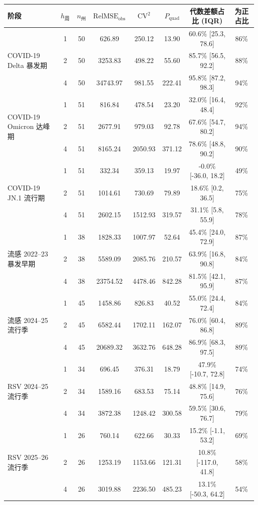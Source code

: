 \begin{tabular}{lccccccc}
\toprule
阶段 & $h_{\text{周}}$ & $n_{\text{州}}$ & $\text{RelMSE}_{\text{obs}}$ & $\text{CV}^2$ & $P_{\text{quad}}$ & 代数差额占比 (IQR) & 为正占比 \\
\midrule
\multirow{3}{*}{COVID-19 Delta 暴发期} & 1 & 50 & 626.89 & 250.12 & 13.90 & 60.6\% [25.3, 78.6] & 86\% \\
 & 2 & 50 & 3253.83 & 498.22 & 55.60 & 85.7\% [56.5, 92.2] & 88\% \\
 & 4 & 50 & 34743.97 & 981.55 & 222.41 & 95.8\% [87.2, 98.3] & 94\% \\
\midrule
\multirow{3}{*}{COVID-19 Omicron 达峰期} & 1 & 51 & 816.84 & 478.54 & 23.20 & 32.0\% [16.4, 48.4] & 92\% \\
 & 2 & 51 & 2677.91 & 979.03 & 92.78 & 67.6\% [54.7, 80.2] & 94\% \\
 & 4 & 51 & 8165.24 & 2050.93 & 371.12 & 78.6\% [48.8, 90.2] & 90\% \\
\midrule
\multirow{3}{*}{COVID-19 JN.1 流行期} & 1 & 51 & 332.34 & 359.13 & 19.97 & -0.0\% [-36.0, 18.2] & 49\% \\
 & 2 & 51 & 1014.61 & 730.69 & 79.89 & 18.6\% [0.2, 36.5] & 75\% \\
 & 4 & 51 & 2602.15 & 1512.93 & 319.57 & 31.1\% [5.8, 55.9] & 78\% \\
\midrule
\multirow{3}{*}{流感 2022--23 暴发早期} & 1 & 38 & 1828.33 & 1007.97 & 52.64 & 45.4\% [24.0, 72.9] & 87\% \\
 & 2 & 38 & 5589.09 & 2085.76 & 210.57 & 63.9\% [16.8, 90.8] & 84\% \\
 & 4 & 38 & 23754.52 & 4478.46 & 842.28 & 81.5\% [42.1, 95.9] & 87\% \\
\midrule
\multirow{3}{*}{流感 2024--25 流行季} & 1 & 45 & 1458.86 & 826.83 & 40.52 & 55.0\% [24.4, 72.4] & 84\% \\
 & 2 & 45 & 6582.44 & 1702.11 & 162.07 & 76.0\% [60.4, 86.8] & 89\% \\
 & 4 & 45 & 20689.32 & 3632.76 & 648.28 & 86.9\% [68.3, 97.5] & 89\% \\
\midrule
\multirow{3}{*}{RSV 2024--25 流行季} & 1 & 34 & 696.45 & 376.31 & 18.79 & 47.9\% [-10.7, 72.8] & 74\% \\
 & 2 & 34 & 1589.16 & 683.53 & 75.14 & 48.8\% [14.9, 75.6] & 76\% \\
 & 4 & 34 & 3872.38 & 1248.42 & 300.58 & 59.5\% [30.6, 76.7] & 79\% \\
\midrule
\multirow{3}{*}{RSV 2025--26 流行季} & 1 & 26 & 760.14 & 622.66 & 30.33 & 15.2\% [-1.1, 53.2] & 69\% \\
 & 2 & 26 & 1253.19 & 1153.66 & 121.31 & 10.8\% [-117.0, 41.8] & 58\% \\
 & 4 & 26 & 3019.88 & 2236.50 & 485.23 & 13.1\% [-50.3, 64.2] & 54\% \\
\bottomrule
\end{tabular}

